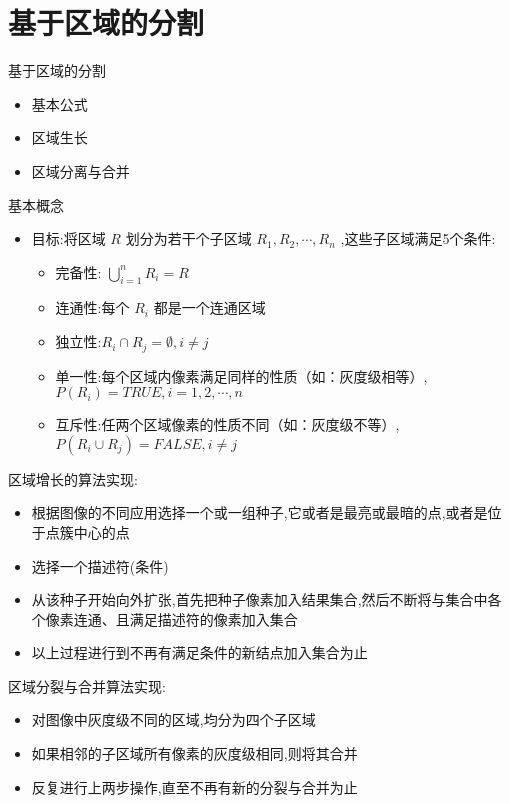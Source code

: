 \documentclass[presentation]{beamer}
\begin{document}
\section{基于区域的分割}
\label{sec:orge85f178}
\begin{frame}[label={sec:org554c84c}]{基于区域的分割}
\begin{itemize}
\item 基本公式
\item 区域生长
\item 区域分离与合并
\end{itemize}
\end{frame}

\begin{frame}[label={sec:org2e09358}]{基本概念}
\begin{itemize}
\item 目标:将区域 \(R\) 划分为若干个子区域 \(R_1,R_2,\cdots,R_n\) ,这些子区域满足5个条件:
\begin{itemize}
\item 完备性:  \(\bigcup_{i=1}^n R_i=R\)
\item 连通性:每个 \(R_i\) 都是一个连通区域
\item 独立性:\(R_i\cap R_j=\emptyset,i\neq j\)
\item 单一性:每个区域内像素满足同样的性质（如：灰度级相等）, \(P(R_i)= TRUE,i = 1,2,\cdots,n\)
\item 互斥性:任两个区域像素的性质不同（如：灰度级不等）, \(P(R_i\cup R_j)= FALSE,i\neq j\)
\end{itemize}
\end{itemize}
\end{frame}

\begin{frame}[label={sec:org0dd7fbb}]{区域增长的算法实现:}
\begin{itemize}
\item 根据图像的不同应用选择一个或一组种子,它或者是最亮或最暗的点,或者是位于点簇中心的点
\item 选择一个描述符(条件)
\item 从该种子开始向外扩张,首先把种子像素加入结果集合,然后不断将与集合中各个像素连通、且满足描述符的像素加入集合
\item 以上过程进行到不再有满足条件的新结点加入集合为止
\end{itemize}
\end{frame}

\begin{frame}[label={sec:org70bfeae}]{区域分裂与合并算法实现:}
\begin{itemize}
\item 对图像中灰度级不同的区域,均分为四个子区域
\item 如果相邻的子区域所有像素的灰度级相同,则将其合并
\item 反复进行上两步操作,直至不再有新的分裂与合并为止
\end{itemize}
\end{frame}
\end{document}
